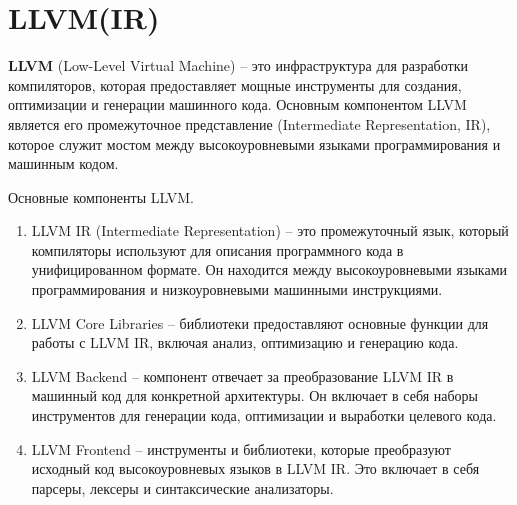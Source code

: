 \section{LLVM(IR)}

\textbf{LLVM} (Low-Level Virtual Machine) \cite{llvm-ir} -- это инфраструктура для разработки компиляторов, которая предоставляет мощные инструменты для создания, оптимизации и генерации машинного кода. Основным компонентом LLVM является его промежуточное представление (Intermediate Representation, IR), которое служит мостом между высокоуровневыми языками программирования и машинным кодом.

Основные компоненты LLVM.
\begin{enumerate}
  \item LLVM IR (Intermediate Representation) -- это промежуточный язык, который компиляторы используют для описания программного кода в унифицированном формате. Он находится между высокоуровневыми языками программирования и низкоуровневыми машинными инструкциями.
  \item LLVM Core Libraries -- библиотеки предоставляют основные функции для работы с LLVM IR, включая анализ, оптимизацию и генерацию кода.
  \item LLVM Backend -- компонент отвечает за преобразование LLVM IR в машинный код для конкретной архитектуры. Он включает в себя наборы инструментов для генерации кода, оптимизации и выработки целевого кода.
  \item LLVM Frontend -- инструменты и библиотеки, которые преобразуют исходный код высокоуровневых языков в LLVM IR. Это включает в себя парсеры, лексеры и синтаксические анализаторы.
\end{enumerate}


